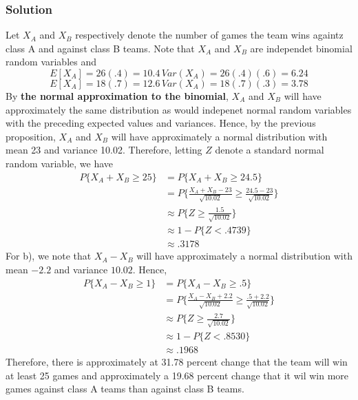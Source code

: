\subsubsection*{Solution}
Let $X_A$ and $X_B$ respectively denote the number of games the team wins againtz class A and against class B teams. Note that $X_A$ and $X_B$ are independet binomial random variables and \[E[X_A] = 26(.4) = 10.4\, Var(X_A) = 26(.4)(.6) = 6.24\] \[E[X_A] = 18(.7) = 12.6\, Var(X_A) = 18(.7)(.3) = 3.78\]
By \textbf{the normal approximation to the binomial}, $X_A$ and $X_B$ will have approximately the same distribution as would indepenet normal random variables with the preceding expected values and variances. Hence, by the previous proposition, $X_A$ and $X_B$ will have approximately a normal distribution with mean 23 and variance 10.02. Therefore, letting $Z$ denote a standard normal random variable, we have 
\begin{equation*}
    \begin{split}
        P\{X_A + X_B\geq 25\} &= P\{X_A + X_B\geq 24.5\}\\
        &= P\{\frac{X_A + X_B - 23}{\sqrt{10.02}}\geq\frac{24.5-23}{\sqrt{10.02}}\}\\
        &\approx P\{Z\geq \frac{1.5}{\sqrt{10.02}}\}\\
        &\approx 1 - P\{Z < .4739\}\\
        &\approx .3178
    \end{split}
\end{equation*}
For b), we note that $X_A - X_B$ will have approximately a normal distribution with mean $-2.2$ and variance $10.02$. Hence, 
\begin{equation*}
    \begin{split}
        P\{X_A - X_B\geq 1\} &= P\{X_A - X_B\geq .5\}\\
        &= P\{\frac{X_A - X_B + 2.2}{\sqrt{10.02}}\geq\frac{.5 + 2.2}{\sqrt{10.02}}\}\\
        &\approx P\{Z\geq\frac{2.7}{\sqrt{10.02}}\}\\
        &\approx 1 - P\{Z < .8530\}\\
        &\approx .1968
    \end{split}
\end{equation*}
Therefore, there is approximately at 31.78 percent change that the team will win at least 25 games and approximately a 19.68 percent change that it wil win more games against class A teams than against class B teams. 
